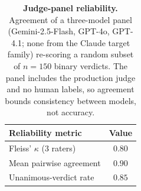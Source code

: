 \begin{table}[!htb]
\centering
\small
\setlength{\tabcolsep}{8pt}
\renewcommand{\arraystretch}{1.15}
\caption{\textbf{Judge-panel reliability.} Agreement of a three-model panel (Gemini-2.5-Flash,
GPT-4o, GPT-4.1; none from the Claude target family) re-scoring a random subset of $n{=}150$ binary
verdicts. The panel includes the production judge and no human labels, so agreement bounds consistency between models, not accuracy.}
\label{tab:appjudges}
\begin{tabular}{@{}l c@{}}
\toprule
\textbf{Reliability metric} & \textbf{Value} \\
\midrule
Fleiss' $\kappa$ (3 raters)     & $0.80$ \\
Mean pairwise agreement         & $0.90$ \\
Unanimous-verdict rate          & $0.85$ \\
\bottomrule
\end{tabular}
\end{table}
